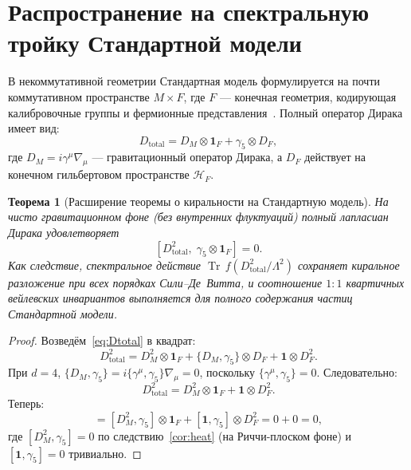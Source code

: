\documentclass[12pt,a4paper]{article}
\newtheorem{theorem}{Теорема}[section]
\theoremstyle{definition}
\theoremstyle{remark}
\newcommand{\Tr}{\operatorname{Tr}}
\newcommand{\Lam}{\Lambda}
\begin{document}
\section{Распространение на спектральную тройку Стандартной модели}
\label{sec:sm}

В некоммутативной геометрии Стандартная модель формулируется на
почти коммутативном пространстве $M \times F$, где $F$ --- конечная
геометрия, кодирующая калибровочные группы и фермионные
представления~\cite{Chamseddine:2006ep,vanSuijlekom:2014pya}.
Полный оператор Дирака имеет вид:
\begin{equation}\label{eq:Dtotal}
  D_{\mathrm{total}} = D_M \otimes \mathbf{1}_F + \gamma_5 \otimes D_F,
\end{equation}
где $D_M = i\gamma^\mu\nabla_\mu$ --- гравитационный оператор Дирака, а
$D_F$ действует на конечном гильбертовом пространстве $\mathcal{H}_F$.

\begin{theorem}[Расширение теоремы о киральности на Стандартную модель]
\label{thm:sm}
На чисто гравитационном фоне (без внутренних флуктуаций) полный лапласиан
Дирака удовлетворяет
\begin{equation}\label{eq:D2-sm}
  [D_{\mathrm{total}}^2,\; \gamma_5 \otimes \mathbf{1}_F] = 0.
\end{equation}
Как следствие, спектральное действие
$\Tr\,f(D_{\mathrm{total}}^2/\Lam^2)$ сохраняет киральное разложение
при всех порядках Сили--Де~Витта, и соотношение $1{:}1$ квартичных
вейлевских инвариантов выполняется для полного содержания частиц
Стандартной модели.
\end{theorem}

\begin{proof}
Возведём~\eqref{eq:Dtotal} в квадрат:
\begin{equation}\label{eq:D2total}
  D_{\mathrm{total}}^2 = D_M^2 \otimes \mathbf{1}_F
  + \{D_M, \gamma_5\} \otimes D_F
  + \mathbf{1} \otimes D_F^2.
\end{equation}
При $d = 4$, $\{D_M, \gamma_5\} = i\{\gamma^\mu, \gamma_5\}\nabla_\mu = 0$,
поскольку $\{\gamma^\mu, \gamma_5\} = 0$.  Следовательно:
\begin{equation}
  D_{\mathrm{total}}^2 = D_M^2 \otimes \mathbf{1}_F
  + \mathbf{1} \otimes D_F^2.
\end{equation}
Теперь:
\begin{equation}
  [D_{\mathrm{total}}^2,\; \gamma_5 \otimes \mathbf{1}_F]
  = [D_M^2, \gamma_5] \otimes \mathbf{1}_F
  + [\mathbf{1}, \gamma_5] \otimes D_F^2
  = 0 + 0 = 0,
\end{equation}
где $[D_M^2, \gamma_5] = 0$ по следствию~\ref{cor:heat} (на Риччи-плоском
фоне) и $[\mathbf{1}, \gamma_5] = 0$ тривиально.
\end{proof}
\end{document}
